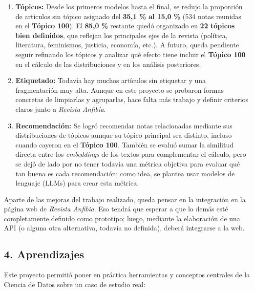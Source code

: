 \documentclass[
]{article}
\begin{document}
\begin{enumerate}
\def\labelenumi{\arabic{enumi}.}
\item
  \textbf{Tópicos:} Desde los primeros modelos hasta el final, se redujo
  la proporción de artículos sin tópico asignado del \textbf{35,1 \% al
  15,0 \%} (534 notas reunidas en el \textbf{Tópico 100}). El
  \textbf{85,0 \%} restante quedó organizado en \textbf{22 tópicos bien
  definidos}, que reflejan los principales ejes de la revista (política,
  literatura, feminismos, justicia, economía, etc.). A futuro, queda
  pendiente seguir refinando los tópicos y analizar qué efecto tiene
  incluir el \textbf{Tópico 100} en el cálculo de las distribuciones y
  en los análisis posteriores.
\item
  \textbf{Etiquetado:} Todavía hay muchos artículos sin etiquetar y una
  fragmentación muy alta. Aunque en este proyecto se probaron formas
  concretas de limpiarlas y agruparlas, hace falta más trabajo y definir
  criterios claros junto a \emph{Revista Anfibia}.
\item
  \textbf{Recomendación:} Se logró recomendar notas relacionadas
  mediante sus distribuciones de tópicos aunque su tópico principal sea
  distinto, incluso cuando cayeron en el \textbf{Tópico 100}. También se
  evaluó sumar la similitud directa entre los \emph{embeddings} de los
  textos para complementar el cálculo, pero se dejó de lado por no tener
  todavía una métrica objetiva para evaluar qué tan buena es cada
  recomendación; como idea, se plantea usar modelos de lenguaje (LLMs)
  para crear esta métrica.
\end{enumerate}

Aparte de las mejoras del trabajo realizado, queda pensar en la
integración en la página web de \emph{Revista Anfibia}. Eso tendrá que
esperar a que lo demás esté completamente definido como prototipo;
luego, mediante la elaboración de una API (o alguna otra alternativa,
todavía no definida), deberá integrarse a la web.

\subsection{4. Aprendizajes}\label{aprendizajes}

Este proyecto permitió poner en práctica herramientas y conceptos
centrales de la Ciencia de Datos sobre un caso de estudio real:
\end{document}
